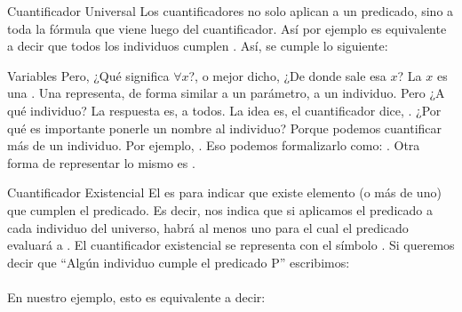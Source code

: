 
\begin{frame}{Cuantificador Universal}
  Los cuantificadores no solo aplican a un predicado, sino a toda la fórmula que
  viene luego del cuantificador.
  \jump
  Así por ejemplo  es equivalente
  a decir que todos los individuos cumplen .
  \jump
  Así, se cumple lo siguiente:\\
  \footnotesize
\end{frame}


\begin{frame}{Variables}
  Pero, ¿Qué significa $\forall x$?, o mejor dicho, ¿De donde sale esa $x$?
  \jump
  La $x$ es una . Una  representa, de forma
  similar a un parámetro, a un individuo. Pero ¿A qué individuo? La respuesta es,
  a todos.
  \jump
  La idea es, el cuantificador dice, .
  \jump
  ¿Por qué es importante ponerle un nombre al individuo? Porque podemos cuantificar
  más de un individuo. Por ejemplo, .
  \jump
  Eso podemos formalizarlo como: . Otra
  forma de representar lo mismo es .
\end{frame}


\begin{frame}{Cuantificador Existencial}
  El  es para indicar que existe 
  elemento (o más de uno) que cumplen el predicado.
  \jump
  Es decir, nos indica que si aplicamos el predicado a cada individuo del universo,
  habrá al menos uno para el cual el predicado evaluará a \fulltrue.
  \jump
  El cuantificador existencial se representa con el símbolo .
  \jump
  Si queremos decir que ``Algún individuo cumple el predicado P'' escribimos:\\
  \\
  \jump
  En nuestro ejemplo, esto es equivalente a decir:\\
  \\
\end{frame}

